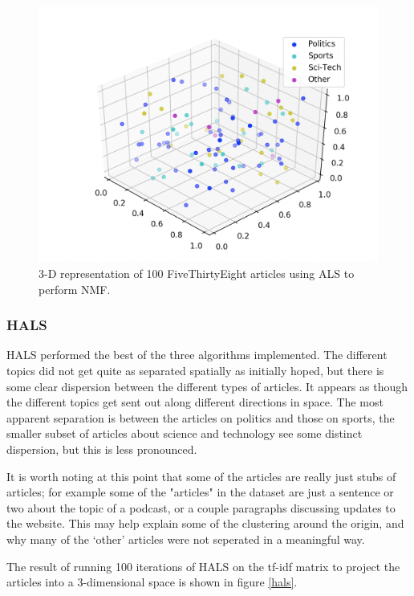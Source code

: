 \documentclass[12pt]{article}
\begin{document}
\begin{figure}
    \centering
    \includegraphics[scale=0.5]{als.png}
    \caption{3-D representation of 100 FiveThirtyEight articles using ALS to perform NMF.}
    \label{als}
\end{figure}


\subsubsection*{HALS}

HALS performed the best of the three algorithms implemented. The different topics did not get quite as separated spatially as initially hoped, but there is some clear dispersion between the different types of articles. It appears as though the different topics get sent out along different directions in space.
The most apparent separation is between the articles on politics and those on sports, the smaller subset of articles about science and technology see some distinct dispersion, but this is less pronounced.

It is worth noting at this point that some of the articles are really just stubs of articles; for example some of the "articles" in the dataset are just a sentence or two about the topic of a podcast, or a couple paragraphs discussing updates to the website. This may help explain some of the clustering around the origin, and why many of the `other' articles were not seperated in a meaningful way.

The result of running 100 iterations of HALS on the tf-idf matrix to project the articles into a 3-dimensional space is shown in figure \ref{hals}.
\end{document}
